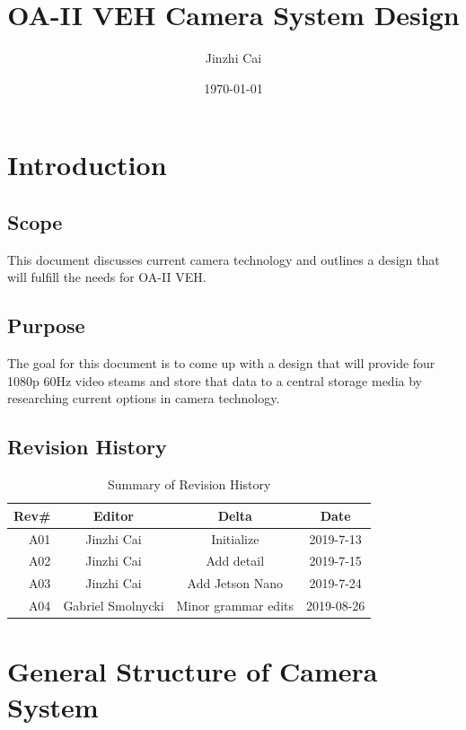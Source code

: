 \documentclass[12pt,article]{memoir}
\title{OA-II VEH Camera System Design}
\author{Jinzhi Cai}
\date{\today}
\begin{document}
	


\tableofcontents*
\clearpage

\chapter{Introduction}
\section{Scope}
This document discusses current camera technology and outlines a design that will fulfill the needs for OA-II VEH.
\section{Purpose}
The goal for this document is to come up with a design that will provide four 1080p 60Hz video steams and store that data to a central storage media by researching current options in camera technology.
\section{Revision History}

\begin{table}[H]
	\centering
	\begin{tabu}{r || c | c | c }
		Rev\# & Editor & Delta & Date\\ \hline
		A01 & Jinzhi Cai & Initialize & 2019-7-13\\ \hline
		A02 & Jinzhi Cai & Add detail & 2019-7-15\\
		A03 & Jinzhi Cai & Add Jetson Nano & 2019-7-24\\
		A04 & Gabriel Smolnycki & Minor grammar edits & 2019-08-26
	\end{tabu}
	\caption{Summary of Revision History}
	\label{tab:rev}
\end{table}

\newpage
\chapter{General Structure of Camera System}
\end{document}
